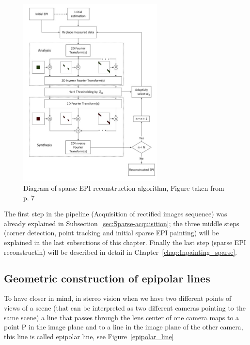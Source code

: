 \begin{figure}[h!]
\centering
\includegraphics[width = 0.65\textwidth]{./Diagrams/Sparse_rec_diagram.jpg}
\caption{Diagram of sparse EPI reconstruction algorithm, Figure taken from \cite{LF-Shearlets} p. 7}
\label{fig:EPI_rec}
\end{figure}

The first step in the pipeline (Acquisition of rectified images sequence) was already explained in Subsection~\ref{sec:Sparse-acquisition}; the three middle steps (corner detection, point tracking and initial sparse EPI painting) will be explained in the last subsections of this chapter. Finally the last step (sparse EPI reconstructin) will be described in detail in Chapter~\ref{chap:Inpainting_sparse}.

\subsection{Geometric construction of epipolar lines}

To have closer in mind, in stereo vision when we have two different points of views of a scene (that can be interpreted as two different cameras pointing to the same scene) a line that passes through the lens center of one camera maps to a point P in the image plane and to a line in the image plane of the other camera, this line is called epipolar line, see Figure~\ref{epipolar_line}

